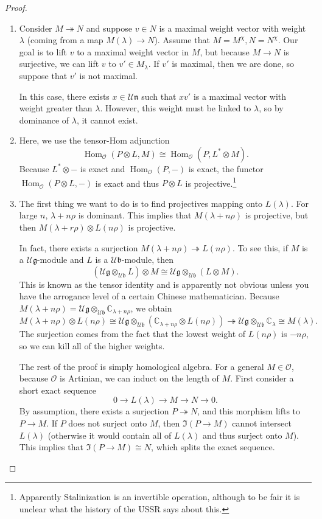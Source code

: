 \documentclass[leqno, openany]{memoir}
\theoremstyle{definition}
\theoremstyle{remark}
\theoremstyle{plain}
\theoremstyle{definition}
\theoremstyle{remark}
\newcommand{\C}{\mathbb{C}}
\newcommand{\U}{\mathcal{U}}
\newcommand{\cO}{\mathcal{O}}
\newcommand{\g}{\mathfrak{g}}
\newcommand{\n}{\mathfrak{n}}
\renewcommand{\b}{\mathfrak{b}}
\DeclareMathOperator{\Hom}{Hom}
\begin{document}
\begin{proof}\leavevmode
    \begin{enumerate}
        \item Consider $M \twoheadrightarrow N$ and suppose $v \in N$ is a maximal weight vector with weight $\lambda$ (coming from a map $M(\lambda) \to N$). Assume that $M = M^{\chi}, N = N^{\chi}$. Our goal is to lift $v$ to a maximal weight vector in $M$, but because $M \to N$ is surjective, we can lift $v$ to $v' \in M_{\lambda}$. If $v'$ is maximal, then we are done, so suppose that $v'$ is not maximal.

            In this case, there exists $x \in \U \n$ such that $xv'$ is a maximal vector with weight greater than $\lambda$. However, this weight must be linked to $\lambda$, so by dominance of $\lambda$, it cannot exist.
        \item Here, we use the tensor-Hom adjunction
            \[ \Hom_{\cO}(P \otimes L, M) \cong \Hom_{\cO}(P, L^* \otimes M). \]
            Because $L^* \otimes -$ is exact and $\Hom_{\cO}(P, -)$ is exact, the functor $\Hom_{\cO}(P \otimes L, -)$ is exact and thus $P \otimes L$ is projective.\footnote{Apparently Stalinization is an invertible operation, although to be fair it is unclear what the history of the USSR says about this.}
        \item The first thing we want to do is to find projectives mapping onto $L(\lambda)$. For large $n$, $\lambda + n \rho$ is dominant. This implies that $M(\lambda + n \rho)$ is projective, but then $M(\lambda + r \rho) \otimes L(n \rho)$ is projective.

            In fact, there exists a surjection $M(\lambda + n \rho) \twoheadrightarrow L(n\rho)$. To see this, if $M$ is a $\U \g$-module and $L$ is a $\U \b$-module, then
            \[ (\U \g \otimes_{\U \b} L) \otimes M \cong \U \g \otimes_{\U \b} (L \otimes M). \]
            This is known as the tensor identity and is apparently not obvious unless you have the arrogance level of a certain Chinese mathematician. Because $M(\lambda + n\rho) = \U \g \otimes_{\U\b} \C_{\lambda + n\rho}$, we obtain
            \[ M(\lambda + n \rho) \otimes L(n \rho) \cong \U \g \otimes_{\U \b} (\C_{\lambda + n\rho} \otimes L(n \rho)) \twoheadrightarrow \U \g \otimes_{\U\b} \C_{\lambda} \cong M(\lambda). \]
            The surjection comes from the fact that the lowest weight of $L(n \rho)$ is $-n\rho$, so we can kill all of the higher weights.

            The rest of the proof is simply homological algebra. For a general $M \in \cO$, because $\cO$ is Artinian, we can induct on the length of $M$. First consider a short exact sequence
            \[ 0 \to L(\lambda) \to M \to N \to 0. \]
            By assumption, there exists a surjection $P \twoheadrightarrow N$, and this morphism lifts to $P \to M$. If $P$ does not surject onto $M$, then $\Im(P \to M)$ cannot intersect $L(\lambda)$ (otherwise it would contain all of $L(\lambda)$ and thus surject onto $M$). This implies that $\Im (P \to M) \cong N$, which splits the exact sequence. \qedhere
    \end{enumerate}
\end{proof}
\end{document}
